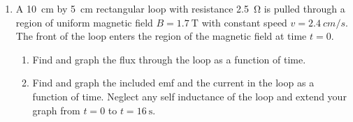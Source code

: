 \documentclass{../../oss-apphys}
\begin{document}
\begin{center}
\end{center}

\begin{enumerate}[leftmargin=18pt,resume]
\item A \SI{10}{cm} by \SI{5}{cm} rectangular loop with resistance
  \SI{2.5}{\ohm} is pulled through a region of uniform magnetic field
  $B=\SI{1.7}{\tesla}$ with constant speed $v=\SI{2.4}{cm/s}$. The front of the
  loop enters the region of the magnetic field at time $t=0$.
  \begin{enumerate}[noitemsep,leftmargin=18pt]
  \item Find and graph the flux through the loop as a function of time.
  \item Find and graph the included emf and the current in the loop as a
    function of time. Neglect any self inductance of the loop and extend your
    graph from $t=0$ to $t=\SI{16}{\second}$.
  \end{enumerate}
\end{enumerate}
\end{document}
